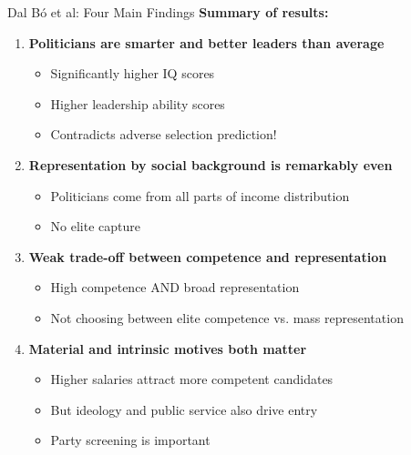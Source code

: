 \documentclass[10pt]{beamer}
\begin{document}
\begin{frame}{Dal Bó et al: Four Main Findings}
\textbf{Summary of results:}


\begin{enumerate}
\item \textbf{Politicians are smarter and better leaders than average}
\begin{itemize}
\item Significantly higher IQ scores
\item Higher leadership ability scores
\item \alert{Contradicts adverse selection prediction!}
\end{itemize}


\item \textbf{Representation by social background is remarkably even}
\begin{itemize}
\item Politicians come from all parts of income distribution
\item No elite capture
\end{itemize}


\item \textbf{Weak trade-off between competence and representation}
\begin{itemize}
\item High competence AND broad representation
\item Not choosing between elite competence vs. mass representation
\end{itemize}


\item \textbf{Material and intrinsic motives both matter}
\begin{itemize}
\item Higher salaries attract more competent candidates
\item But ideology and public service also drive entry
\item Party screening is important
\end{itemize}
\end{enumerate}
\end{frame}
\end{document}
